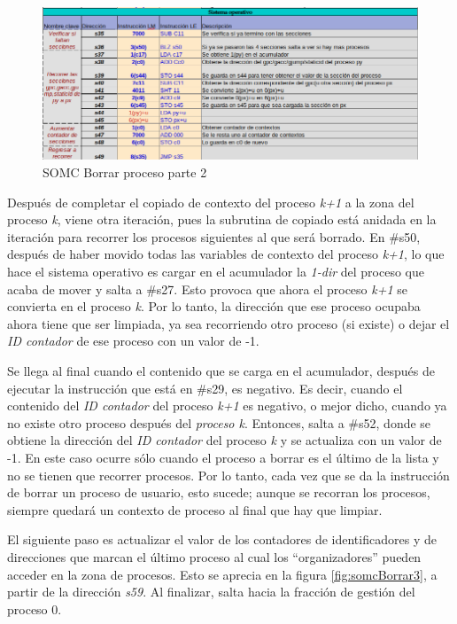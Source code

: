 \documentclass[letterpaper,12pt,oneside]{book}
\begin{document}
		
		\begin{figure}[h]		
			\centering
			\includegraphics[scale=0.53]{media/CARDIACC/SO_Borrar2.png}
			\caption{ SOMC Borrar proceso parte 2}
			\label{fig:somcBorrar2}
		\end{figure}
		
		Después de completar el copiado de contexto del proceso \textit{k+1} a la zona del proceso \textit{k},
		viene otra iteración, pues la subrutina de copiado está anidada en la iteración para
		recorrer los procesos siguientes al que será borrado. En \#s50, después de haber movido todas las variables de contexto del proceso
		\textit{k+1}, lo que hace el sistema operativo es cargar en el acumulador la \textit{1-dir} del proceso que acaba de mover y salta a \#s27.
		Esto provoca que ahora el proceso \textit{k+1} se convierta en el proceso \textit{k}. Por lo tanto, 
		la dirección que ese proceso
		ocupaba ahora tiene que ser limpiada, ya sea recorriendo otro proceso (si existe) o dejar el \textit{ID contador} de ese proceso
		con un valor de -1. 
		

		Se llega al final cuando el contenido que se carga en el acumulador, después de ejecutar la instrucción que está en \#s29, es
		negativo. Es decir, cuando el contenido del \textit{ID contador} del proceso \textit{k+1} es negativo, o mejor dicho,
		cuando ya no existe otro proceso después del \textit{proceso k}. Entonces, salta a \#s52, donde se obtiene la dirección del \textit{ID contador} 
		del proceso \textit{k}
		y se actualiza con un valor de -1. En este caso ocurre sólo cuando el proceso
		a borrar es el último de la lista y no se tienen que recorrer procesos. Por lo tanto, cada vez que se da la instrucción de borrar un proceso
		de usuario, esto sucede; aunque se recorran los procesos, siempre quedará un contexto de proceso al final que hay que limpiar.
		
		
		El siguiente paso es actualizar el valor de los contadores de identificadores y de direcciones que marcan
		el último proceso  al cual los ``organizadores'' pueden acceder en la zona de procesos. Esto se aprecia
		en la figura \ref{fig:somcBorrar3}, a partir de la dirección \textit{s59}. Al finalizar, salta hacia la fracción de gestión del proceso 0.
		
\end{document}

